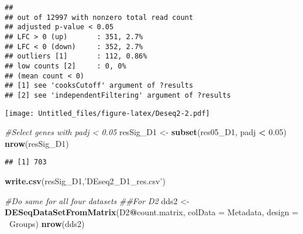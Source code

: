 \documentclass[]{article}
\newenvironment{Shaded}{\begin{snugshade}}{\end{snugshade}}
\newcommand{\CommentTok}[1]{\textcolor[rgb]{0.56,0.35,0.01}{\textit{#1}}}
\newcommand{\DataTypeTok}[1]{\textcolor[rgb]{0.13,0.29,0.53}{#1}}
\newcommand{\DecValTok}[1]{\textcolor[rgb]{0.00,0.00,0.81}{#1}}
\newcommand{\FloatTok}[1]{\textcolor[rgb]{0.00,0.00,0.81}{#1}}
\newcommand{\KeywordTok}[1]{\textcolor[rgb]{0.13,0.29,0.53}{\textbf{#1}}}
\newcommand{\NormalTok}[1]{#1}
\newcommand{\OperatorTok}[1]{\textcolor[rgb]{0.81,0.36,0.00}{\textbf{#1}}}
\newcommand{\StringTok}[1]{\textcolor[rgb]{0.31,0.60,0.02}{#1}}
\begin{document}
\begin{verbatim}
## 
## out of 12997 with nonzero total read count
## adjusted p-value < 0.05
## LFC > 0 (up)       : 351, 2.7%
## LFC < 0 (down)     : 352, 2.7%
## outliers [1]       : 112, 0.86%
## low counts [2]     : 0, 0%
## (mean count < 0)
## [1] see 'cooksCutoff' argument of ?results
## [2] see 'independentFiltering' argument of ?results
\end{verbatim}

\begin{Shaded}
\end{Shaded}

\texttt{[image: Untitled\_files/figure-latex/Deseq2-2.pdf]}

\begin{Shaded}
\begin{Highlighting}[]
\CommentTok{#Select genes with padj < 0.05 }
\NormalTok{resSig_D1 <-}\StringTok{ }\KeywordTok{subset}\NormalTok{(res05_D1, padj }\OperatorTok{<}\StringTok{ }\FloatTok{0.05}\NormalTok{)}
\KeywordTok{nrow}\NormalTok{(resSig_D1)}
\end{Highlighting}
\end{Shaded}

\begin{verbatim}
## [1] 703
\end{verbatim}

\begin{Shaded}
\begin{Highlighting}[]
\KeywordTok{write.csv}\NormalTok{(resSig_D1,}\StringTok{'DEseq2_D1_res.csv'}\NormalTok{)}



\CommentTok{#Do same for all four datasets}
\CommentTok{##For D2}
\NormalTok{dds2 <-}\StringTok{ }\KeywordTok{DESeqDataSetFromMatrix}\NormalTok{(D2}\OperatorTok{@}\NormalTok{count.matrix, }
                              \DataTypeTok{colData =}\NormalTok{ Metadata, }
                              \DataTypeTok{design =} \OperatorTok{~}\NormalTok{Groups)}
\KeywordTok{nrow}\NormalTok{(dds2) }
\end{Highlighting}
\end{Shaded}
\end{document}

